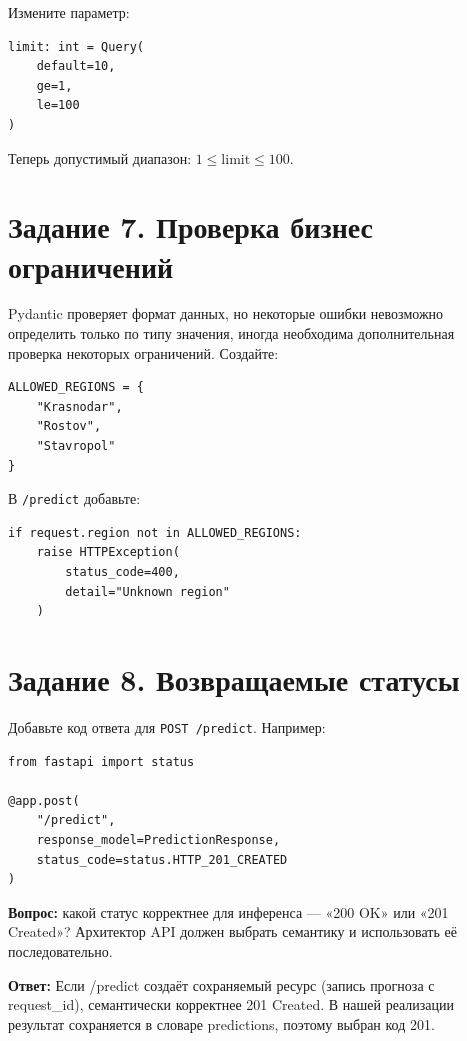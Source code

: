 \documentclass[12pt,a4paper]{article}
\begin{document}
Измените параметр:

\begin{lstlisting}[caption={Валидация limit}]
limit: int = Query(
    default=10,
    ge=1,
    le=100
)
\end{lstlisting}

Теперь допустимый диапазон: $1 \le \text{limit} \le 100$.

\section{Задание 7. Проверка бизнес ограничений}

Pydantic проверяет формат данных, но некоторые ошибки невозможно определить только по типу значения, иногда необходима дополнительная проверка некоторых ограничений. Создайте:

\begin{lstlisting}[caption={Множество допустимых регионов}]
ALLOWED_REGIONS = {
    "Krasnodar",
    "Rostov",
    "Stavropol"
}
\end{lstlisting}

В \texttt{/predict} добавьте:

\begin{lstlisting}[caption={Бизнес-валидация региона}]
if request.region not in ALLOWED_REGIONS:
    raise HTTPException(
        status_code=400,
        detail="Unknown region"
    )
\end{lstlisting}

\section{Задание 8. Возвращаемые статусы}

Добавьте код ответа для \texttt{POST /predict}. Например:

\begin{lstlisting}[caption={Явное указание кода ответа}]
from fastapi import status

@app.post(
    "/predict",
    response_model=PredictionResponse,
    status_code=status.HTTP_201_CREATED
)
\end{lstlisting}

\textbf{Вопрос:} какой статус корректнее для инференса — «200 OK» или «201 Created»? Архитектор API должен выбрать семантику и использовать её последовательно.

\textbf{Ответ:} Если /predict создаёт сохраняемый ресурс (запись прогноза с request\_id), семантически корректнее 201 Created. В нашей реализации результат сохраняется в словаре predictions, поэтому выбран код 201.
\end{document}
